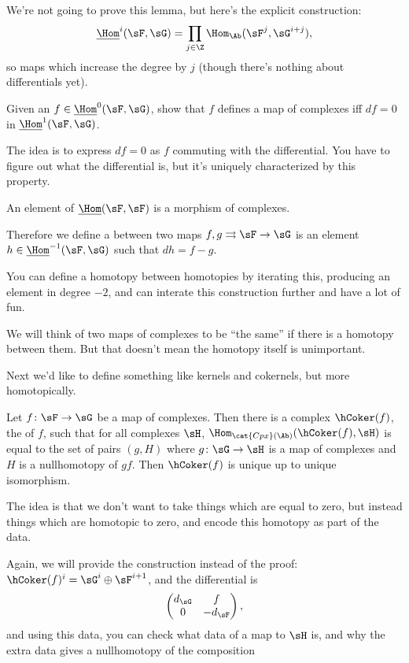 We're not going to prove this lemma, but here's the explicit construction:
\begin{equation}
    \underline{\Hom}^i(\sF,\sG) = \prod_{j\in\Z} \Hom_\Ab(\sF^j, \sG^{i+j}),
\end{equation}
so maps which increase the degree by $j$ (though there's nothing about differentials yet).
\begin{ex}
Given an $f\in\underline{\Hom}^0(\sF,\sG)$, show that $f$ defines a map of complexes iff $df = 0$ in $\underline{\Hom}^1(\sF,\sG)$.
\end{ex}
The idea is to express $df = 0$ as $f$ commuting with the differential. You have to figure out what the differential is, but it's uniquely characterized by this property.
\begin{cor}
An element of $\underline{\Hom}(\sF,\sF)$ is a morphism of complexes.
\end{cor}
\begin{defn}
Therefore we define a  between two maps $f,g\rightrightarrows \sF\to\sG$ is an element $h\in\underline{\Hom}^{-1}(\sF,\sG)$ such that $dh = f-g$.
\end{defn}
You can define a homotopy between homotopies by iterating this, producing an element in degree $-2$, and can interate this construction further and have a lot of fun.

We will think of two maps of complexes to be ``the same'' if there is a homotopy between them. But that doesn't mean the homotopy itself is unimportant.

Next we'd like to define something like kernels and cokernels, but more homotopically.
\begin{defn}
Let $f\colon \sF\to\sG$ be a map of complexes. Then there is a complex $\hCoker(f)$, the  of $f$, such that for all complexes $\sH$, $\Hom_{\cat{Cpx}(\Ab)}(\hCoker(f), \sH)$ is equal to the set of pairs $(g,H)$ where $g\colon\sG\to\sH$ is a map of complexes and $H$ is a nullhomotopy of $gf$. Then $\hCoker(f)$ is unique up to unique isomorphism.
\end{defn}
The idea is that we don't want to take things which are equal to zero, but instead things which are homotopic to zero, and encode this homotopy as part of the data.

Again, we will provide the construction instead of the proof: $\hCoker(f)^i = \sG^i\oplus\sF^{i+1}$, and the differential is
\begin{equation}
    \begin{pmatrix} d_\sG & f\\ 0 & -d_\sF\end{pmatrix},
\end{equation}
and using this data, you can check what data of a map to $\sH$ is, and why the extra data gives a nullhomotopy of the composition
